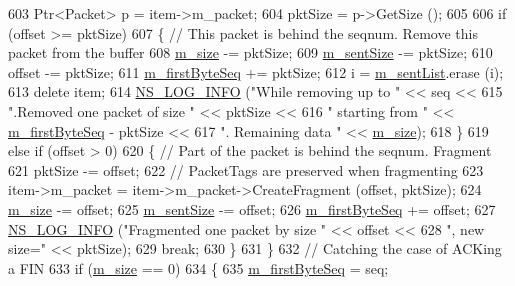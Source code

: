 \begin{DoxyCode}
603       Ptr<Packet> p = item->m\_packet;
604       pktSize = p->GetSize ();
605 
606       \textcolor{keywordflow}{if} (offset >= pktSize)
607         \{ \textcolor{comment}{// This packet is behind the seqnum. Remove this packet from the buffer}
608           \hyperlink{classns3_1_1TcpTxBuffer_ace81d07d65ea00d9609dcc65a926564c}{m\_size} -= pktSize;
609           \hyperlink{classns3_1_1TcpTxBuffer_ae45302ec0a3b3d757b0f3ad85e88e363}{m\_sentSize} -= pktSize;
610           offset -= pktSize;
611           \hyperlink{classns3_1_1TcpTxBuffer_a46b67e5cb3396b43a41dd3fd5b135346}{m\_firstByteSeq} += pktSize;
612           i = \hyperlink{classns3_1_1TcpTxBuffer_ae131f4743f4537f3606db664874440e5}{m\_sentList}.erase (i);
613           \textcolor{keyword}{delete} item;
614           \hyperlink{group__logging_gafbd73ee2cf9f26b319f49086d8e860fb}{NS\_LOG\_INFO} (\textcolor{stringliteral}{"While removing up to "} << seq <<
615                        \textcolor{stringliteral}{".Removed one packet of size "} << pktSize <<
616                        \textcolor{stringliteral}{" starting from "} << \hyperlink{classns3_1_1TcpTxBuffer_a46b67e5cb3396b43a41dd3fd5b135346}{m\_firstByteSeq} - pktSize <<
617                        \textcolor{stringliteral}{". Remaining data "} << \hyperlink{classns3_1_1TcpTxBuffer_ace81d07d65ea00d9609dcc65a926564c}{m\_size});
618         \}
619       \textcolor{keywordflow}{else} \textcolor{keywordflow}{if} (offset > 0)
620         \{ \textcolor{comment}{// Part of the packet is behind the seqnum. Fragment}
621           pktSize -= offset;
622           \textcolor{comment}{// PacketTags are preserved when fragmenting}
623           item->m\_packet = item->m\_packet->CreateFragment (offset, pktSize);
624           \hyperlink{classns3_1_1TcpTxBuffer_ace81d07d65ea00d9609dcc65a926564c}{m\_size} -= offset;
625           \hyperlink{classns3_1_1TcpTxBuffer_ae45302ec0a3b3d757b0f3ad85e88e363}{m\_sentSize} -= offset;
626           \hyperlink{classns3_1_1TcpTxBuffer_a46b67e5cb3396b43a41dd3fd5b135346}{m\_firstByteSeq} += offset;
627           \hyperlink{group__logging_gafbd73ee2cf9f26b319f49086d8e860fb}{NS\_LOG\_INFO} (\textcolor{stringliteral}{"Fragmented one packet by size "} << offset <<
628                        \textcolor{stringliteral}{", new size="} << pktSize);
629           \textcolor{keywordflow}{break};
630         \}
631     \}
632   \textcolor{comment}{// Catching the case of ACKing a FIN}
633   \textcolor{keywordflow}{if} (\hyperlink{classns3_1_1TcpTxBuffer_ace81d07d65ea00d9609dcc65a926564c}{m\_size} == 0)
634     \{
635       \hyperlink{classns3_1_1TcpTxBuffer_a46b67e5cb3396b43a41dd3fd5b135346}{m\_firstByteSeq} = seq;

\end{DoxyCode}
